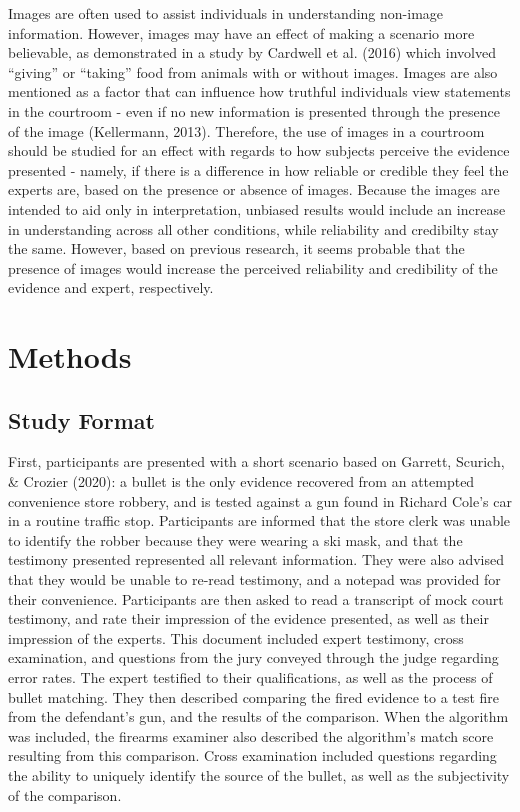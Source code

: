 \documentclass[print]{nuthesis}
\begin{document}
Images are often used to assist individuals in understanding non-image information.
However, images may have an effect of making a scenario more believable, as demonstrated in a study by Cardwell et al. (2016) which involved ``giving'' or ``taking'' food from animals with or without images.
Images are also mentioned as a factor that can influence how truthful individuals view statements in the courtroom - even if no new information is presented through the presence of the image (Kellermann, 2013).
Therefore, the use of images in a courtroom should be studied for an effect with regards to how subjects perceive the evidence presented - namely, if there is a difference in how reliable or credible they feel the experts are, based on the presence or absence of images.
Because the images are intended to aid only in interpretation, unbiased results would include an increase in understanding across all other conditions, while reliability and credibilty stay the same.
However, based on previous research, it seems probable that the presence of images would increase the perceived reliability and credibility of the evidence and expert, respectively.

\hypertarget{methods}{%
\section{Methods}\label{methods}}

\hypertarget{study-format}{%
\subsection{Study Format}\label{study-format}}

First, participants are presented with a short scenario based on Garrett, Scurich, \& Crozier (2020): a bullet is the only evidence recovered from an attempted convenience store robbery, and is tested against a gun found in Richard Cole's car in a routine traffic stop.
Participants are informed that the store clerk was unable to identify the robber because they were wearing a ski mask, and that the testimony presented represented all relevant information.
They were also advised that they would be unable to re-read testimony, and a notepad was provided for their convenience.
Participants are then asked to read a transcript of mock court testimony, and rate their impression of the evidence presented, as well as their impression of the experts.
This document included expert testimony, cross examination, and questions from the jury conveyed through the judge regarding error rates.
The expert testified to their qualifications, as well as the process of bullet matching.
They then described comparing the fired evidence to a test fire from the defendant's gun, and the results of the comparison.
When the algorithm was included, the firearms examiner also described the algorithm's match score resulting from this comparison.
Cross examination included questions regarding the ability to uniquely identify the source of the bullet, as well as the subjectivity of the comparison.
\end{document}
